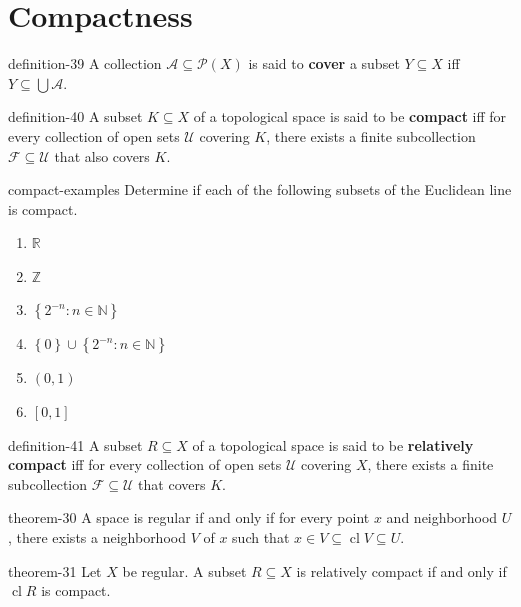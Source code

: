 \documentclass[10pt,]{article}
\newcommand{\terminology}[1]{\textbf{#1}}
\newcommand{\mb}{\mathbb}
\newcommand{\mc}{\mathcal}
\newcommand{\cl}{\operatorname{cl}}
\newcommand{\setBuilder}[2]{\left\{#1:#2\right\}}
\newcommand{\setList}[1]{\left\{#1\right\}}
\begin{document}
\section[{Compactness}]{Compactness}\label{section-compact}
\begin{definition}{}{definition-39}%
\hypertarget{p-138}{}%
A collection \(\mc A\subseteq \mc P(X)\) is said to \terminology{cover} a subset \(Y\subseteq X\) iff \(Y\subseteq\bigcup\mc A\).%
\end{definition}
\begin{definition}{}{definition-40}%
\hypertarget{p-139}{}%
A subset \(K\subseteq X\) of a topological space is said to be \terminology{compact} iff for every collection of open sets \(\mc U\) covering \(K\), there exists a finite subcollection \(\mc F\subseteq\mc U\) that also covers \(K\).%
\end{definition}
\begin{example}{}{compact-examples}%
\hypertarget{p-140}{}%
Determine if each of the following subsets of the Euclidean line is compact.%
\leavevmode%
\begin{enumerate}
\item\hypertarget{li-104}{}\(\mb R\)%
\item\hypertarget{li-105}{}\(\mb Z\)%
\item\hypertarget{li-106}{}\(\setBuilder{2^{-n}}{n\in\mb N}\)%
\item\hypertarget{li-107}{}\(\setList{0}\cup\setBuilder{2^{-n}}{n\in\mb N}\)%
\item\hypertarget{li-108}{}\((0,1)\)%
\item\hypertarget{li-109}{}\([0,1]\)%
\end{enumerate}
\end{example}
\begin{definition}{}{definition-41}%
\hypertarget{p-141}{}%
A subset \(R\subseteq X\) of a topological space is said to be \terminology{relatively compact} iff for every collection of open sets \(\mc U\) covering \(X\), there exists a finite subcollection \(\mc F\subseteq\mc U\) that covers \(K\).%
\end{definition}
\begin{theorem}{}{}{theorem-30}%
\hypertarget{p-142}{}%
A space is regular if and only if for every point \(x\) and neighborhood \(U\), there exists a neighborhood \(V\) of \(x\) such that \(x\in V\subseteq\cl V\subseteq U\).%
\end{theorem}
\begin{theorem}{}{}{theorem-31}%
\hypertarget{p-143}{}%
Let \(X\) be regular. A subset \(R\subseteq X\) is relatively compact if and only if \(\cl R\) is compact.%
\end{theorem}
\end{document}
